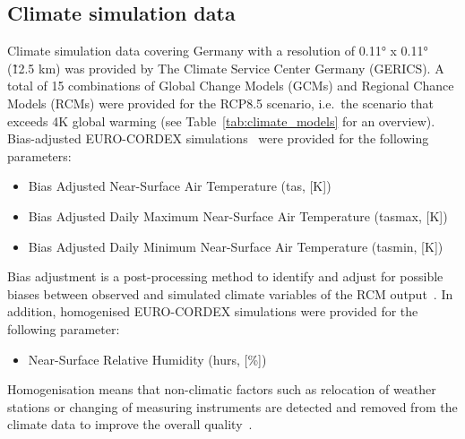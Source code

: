 \documentclass[a4paper, 11pt]{scrartcl}
\begin{document}
\subsection{Climate simulation data} 
Climate simulation data covering Germany with a resolution of 0.11° x 0.11° (\~12.5 km) was provided by The Climate Service Center Germany (GERICS). A total of 15 combinations of Global Change Models (GCMs) and Regional Chance Models (RCMs) were provided for the RCP8.5 scenario, i.e.\ the scenario that exceeds 4K global warming (see Table~\ref{tab:climate_models} for an overview). Bias-adjusted EURO-CORDEX simulations~\parencite{Jacob.2014} were provided for the following parameters:
\begin{itemize}[noitemsep]
\item Bias Adjusted Near-Surface Air Temperature (tas, [K])
\item Bias Adjusted Daily Maximum Near-Surface Air Temperature (tasmax, [K])
\item Bias Adjusted Daily Minimum Near-Surface Air Temperature (tasmin, [K])
\end{itemize}

Bias adjustment is a post-processing method to identify and adjust for possible biases between observed and simulated climate variables of the RCM output~\parencite{Teutschbein.2012, Maraun.2016}. In addition, homogenised EURO-CORDEX simulations were provided for the following parameter:

\begin{itemize}
\item Near-Surface Relative Humidity (hurs, [\%])
\end{itemize}

Homogenisation means that non-climatic factors such as relocation of weather stations or changing of measuring instruments are detected and removed from the climate data to improve the overall quality~\parencite{Ribeiro.2016, Costa.2009}.
\end{document}

